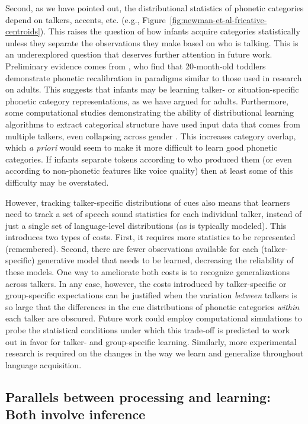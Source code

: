 Second, as we have pointed out, the distributional statistics of phonetic categories depend on talkers, accents, etc. (e.g., Figure~\ref{fig:newman-et-al-fricative-centroids}). This raises the question of how infants acquire categories statistically unless they
separate the observations they make based on who is talking. This is an underexplored question that deserves further attention in future work. Preliminary evidence comes from \textcite{White2011}, who find that 20-month-old toddlers demonstrate phonetic recalibration in paradigms similar to those used in research on adults. This suggests that infants may be learning talker- or situation-specific phonetic category representations, as we have argued for adults.  Furthermore, some computational studies demonstrating the ability of distributional learning algorithms to extract categorical structure have used input data that comes from multiple talkers, even collapsing across gender \autocite[e.g.,][]{Feldman2013a}. This increases category overlap, which \emph{a priori} would seem to make it more difficult to learn good phonetic categories.  If infants separate tokens according to who produced them (or even according to non-phonetic features like voice quality) then at least some of this difficulty may be overstated.  

\label{r1-acquisition}
However, tracking talker-specific distributions of cues also means that learners need to track a set of speech sound statistics for each individual talker, instead of just a single set of language-level distributions (as is typically modeled).  This introduces two types of costs.  First, it requires more statistics to be represented (remembered).  Second, there are fewer observations available for each (talker-specific) generative model that needs to be learned, decreasing the reliability of these models.  One way to ameliorate both costs is to recognize generalizations across talkers. In any case, however, the costs introduced by talker-specific or group-specific expectations can be justified when the variation \emph{between} talkers is so large that the differences in the cue distributions of phonetic categories \emph{within} each talker are obscured.  Future work could employ computational simulations to probe the statistical conditions under which this trade-off is predicted to work out in favor for talker- and group-specific learning. Similarly, more experimental research is required on the changes in the way we learn and generalize throughout language acquisition.

\subsection{Parallels between processing and learning: Both involve inference}
\label{sec:pull-togeth-proc}

